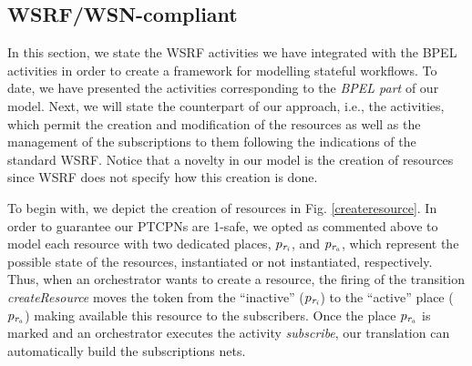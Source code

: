 \subsection*{WSRF/WSN-compliant}
In this section, we state the WSRF activities we have integrated with the BPEL activities in order to create a framework for modelling stateful workflows. 
To date, we have presented the activities corresponding to the \emph{BPEL part} of our model. Next, we will state the counterpart of our approach, i.e., the activities, which permit the creation and modification of the resources as well as the management of the subscriptions to them following the indications of the standard WSRF. Notice that a novelty in our model is the creation of resources since WSRF does not specify how this creation is done.

To begin with, we depict the creation of resources in Fig. \ref{createresource}. In order to guarantee our PTCPNs are 1-safe, we opted as commented above to model each resource with two dedicated places,  $p_{\it r_i}$, and $p_{\it r_a}$, which represent the possible state of the resources, instantiated or not instantiated, respectively. Thus, when an orchestrator wants to create a resource, the firing of the transition {\it createResource} moves the token from the ``inactive'' ($p_{\it r_i}$) to the ``active'' place ($p_{\it r_a}$) making available this resource to the subscribers. Once the place $p_{\it r_a}$ is marked and an orchestrator executes the activity {\em subscribe}, our translation can automatically build the subscriptions nets. 

